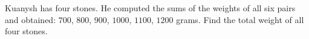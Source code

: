 Kuanysh has four stones. He computed the sums of the weights of all six pairs and obtained: $700$, $800$, $900$, $1000$, $1100$, $1200$ grams. Find the total weight of all four stones.
